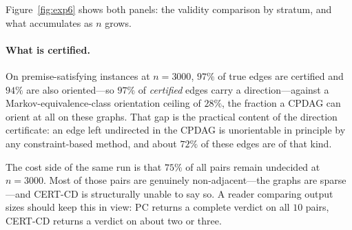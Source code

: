 Figure~\ref{fig:exp6} shows both panels: the validity comparison by stratum,
and what accumulates as $n$ grows.

\paragraph{What is certified.} On premise-satisfying instances at $n = 3000$,
$97\%$ of true edges are certified and $94\%$ are also oriented---so $97\%$ of
\emph{certified} edges carry a direction---against a Markov-equivalence-class
orientation ceiling of $28\%$, the fraction a CPDAG can orient at all on these
graphs. That gap is the practical content of the direction certificate: an
edge left undirected in the CPDAG is unorientable in principle by any
constraint-based method, and about $72\%$ of these edges are of that
kind.

The cost side of the same run is that $75\%$ of all pairs remain undecided at
$n = 3000$. Most of those pairs are genuinely non-adjacent---the graphs are
sparse---and CERT-CD is structurally unable to say so. A reader comparing
output sizes should keep this in view: PC returns a complete verdict on all
$10$ pairs, CERT-CD returns a verdict on about two or three.
